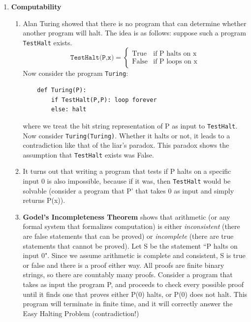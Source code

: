 \documentclass[10pt]{article}
\begin{document}
\begin{multicols}{2}
\begin{enumerate}
\begin{enumerate}
        \end{enumerate}
        \item \textbf{Computability}
        \begin{enumerate}
            \item Alan Turing showed that there is no program that can determine whether another program will halt. The idea is as follows: suppose such a program \texttt{TestHalt} exists.
            \[ \texttt{TestHalt(P,x)} =
            \begin{cases} 
                  \text{True} & \text{if P halts on x} \\
                  \text{False} & \text{if P loops on x} 
               \end{cases}
            \]
            Now consider the program \texttt{Turing}:
            \begin{verbatim}
    def Turing(P):
        if TestHalt(P,P): loop forever
        else: halt
            \end{verbatim}
            where we treat the bit string representation of P as input to \texttt{TestHalt}. Now consider \texttt{Turing(Turing)}. Whether it halts or not, it leads to a contradiction like that of the liar's paradox. This paradox shows the assumption that \texttt{TestHalt} exists was False. 
            \item It turns out that writing a program that tests if P halts on a specific input 0 is also impossible, because if it was, then \texttt{TestHalt} would be solvable (consider a program that P' that takes 0 as input and simply returns P(x)).
            \item \textbf{Godel's Incompleteness Theorem} shows that arithmetic (or any formal system that formalizes computation) is either \textit{inconsistent} (there are false statements that can be proved) or \textit{incomplete} (there are true statements that cannot be proved). Let S be the statement ``P halts on input 0". Since we assume arithmetic is complete and consistent, S is true or false and there is a proof either way. All proofs are finite binary strings, so there are countably many proofs. Consider a program that takes as input the program P, and proceeds to check every possible proof until it finds one that proves either P(0) halts, or P(0) does not halt. This program will terminate in finite time, and it will correctly answer the Easy Halting Problem (contradiction!)
        \end{enumerate}
        

\end{enumerate}
\end{multicols}
\end{document}
